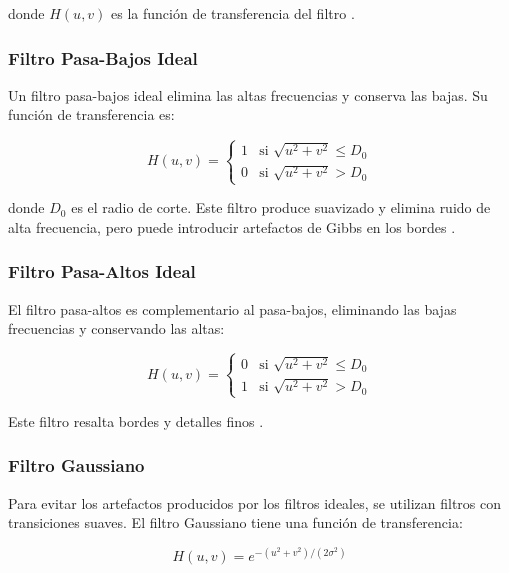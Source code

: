\documentclass[conference]{IEEEtran}
\begin{document}
donde $H(u,v)$ es la función de transferencia del filtro \cite{berkeley2024}.

\subsubsection{Filtro Pasa-Bajos Ideal}

Un filtro pasa-bajos ideal elimina las altas frecuencias y conserva las bajas. Su función de transferencia es:

\begin{equation}
H(u,v) = 
\begin{cases}
1 & \text{si } \sqrt{u^2 + v^2} \leq D_0 \\
0 & \text{si } \sqrt{u^2 + v^2} > D_0
\end{cases}
\label{eq:pasa_bajos}
\end{equation}

donde $D_0$ es el radio de corte. Este filtro produce suavizado y elimina ruido de alta frecuencia, pero puede introducir artefactos de Gibbs en los bordes \cite{gonzalez2018}.

\subsubsection{Filtro Pasa-Altos Ideal}

El filtro pasa-altos es complementario al pasa-bajos, eliminando las bajas frecuencias y conservando las altas:

\begin{equation}
H(u,v) = 
\begin{cases}
0 & \text{si } \sqrt{u^2 + v^2} \leq D_0 \\
1 & \text{si } \sqrt{u^2 + v^2} > D_0
\end{cases}
\label{eq:pasa_altos}
\end{equation}

Este filtro resalta bordes y detalles finos \cite{smith2003}.

\subsubsection{Filtro Gaussiano}

Para evitar los artefactos producidos por los filtros ideales, se utilizan filtros con transiciones suaves. El filtro Gaussiano tiene una función de transferencia:

\begin{equation}
H(u,v) = e^{-(u^2 + v^2) / (2\sigma^2)}
\label{eq:gaussiano}
\end{equation}
\end{document}
